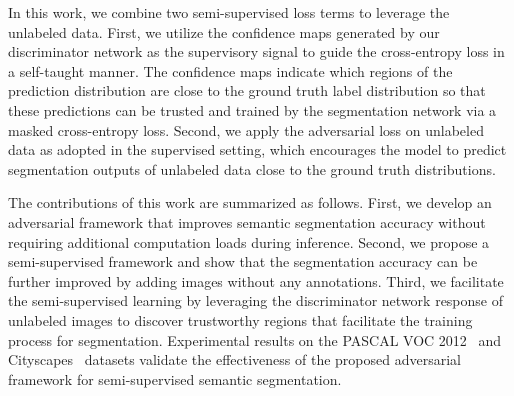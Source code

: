 \documentclass{bmvc2k}
\begin{document}
	In this work, we combine two semi-supervised loss terms to leverage the unlabeled data.
	First, we utilize the confidence maps generated by our discriminator network as the supervisory signal to guide the cross-entropy loss in a self-taught manner.
	The confidence maps indicate which regions of the prediction distribution are close to the ground truth label distribution so that these predictions can be trusted and trained by the segmentation network via a masked cross-entropy loss.
	Second, we apply the adversarial loss on unlabeled data as adopted in the supervised setting, which encourages the model to predict segmentation outputs of unlabeled data close to the ground truth distributions.
	
	The contributions of this work are summarized as follows. First, we develop an adversarial framework that improves semantic segmentation accuracy without requiring additional computation loads during inference.
	Second, we propose a semi-supervised framework and show that the segmentation accuracy can be further improved by adding images without any annotations.
	Third, we facilitate the semi-supervised learning by leveraging the discriminator network response of unlabeled images to discover trustworthy regions that facilitate 
	the training process for segmentation.
	Experimental results on the PASCAL VOC 2012~\cite{pascal} and Cityscapes~\cite{cityscapes} datasets validate the effectiveness of the proposed adversarial framework for semi-supervised semantic segmentation.
	
\end{document}
